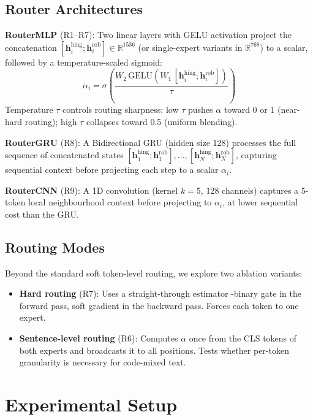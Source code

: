\documentclass[conference]{IEEEtran}
\begin{document}
\subsection{Router Architectures}

\textbf{RouterMLP} (R1--R7): Two linear layers with GELU activation project the concatenation $[\mathbf{h}^{\text{hing}}_i; \mathbf{h}^{\text{rob}}_i] \in \mathbb{R}^{1536}$ (or single-expert variants in $\mathbb{R}^{768}$) to a scalar, followed by a temperature-scaled sigmoid:
\begin{equation}
    \alpha_i = \sigma\!\left(\frac{W_2\,\text{GELU}(W_1\,[\mathbf{h}^{\text{hing}}_i; \mathbf{h}^{\text{rob}}_i])}{\tau}\right)
\end{equation}
Temperature $\tau$ controls routing sharpness: low $\tau$ pushes $\alpha$ toward 0 or 1 (near-hard routing); high $\tau$ collapses toward 0.5 (uniform blending).

\textbf{RouterGRU} (R8): A Bidirectional GRU (hidden size 128) processes the full sequence of concatenated states $[\mathbf{h}^{\text{hing}}_1; \mathbf{h}^{\text{rob}}_1], \ldots, [\mathbf{h}^{\text{hing}}_N; \mathbf{h}^{\text{rob}}_N]$, capturing sequential context before projecting each step to a scalar $\alpha_i$.

\textbf{RouterCNN} (R9): A 1D convolution (kernel $k{=}5$, 128 channels) captures a 5-token local neighbourhood context before projecting to $\alpha_i$, at lower sequential cost than the GRU.

\subsection{Routing Modes}

Beyond the standard soft token-level routing, we explore two ablation variants:
\begin{itemize}
  \item \textbf{Hard routing} (R7): Uses a straight-through estimator \cite{bengio2013ste}-binary gate in the forward pass, soft gradient in the backward pass. Forces each token to one expert.
  \item \textbf{Sentence-level routing} (R6): Computes $\alpha$ once from the CLS tokens of both experts and broadcasts it to all positions. Tests whether per-token granularity is necessary for code-mixed text.
\end{itemize}

\section{Experimental Setup}
\end{document}
